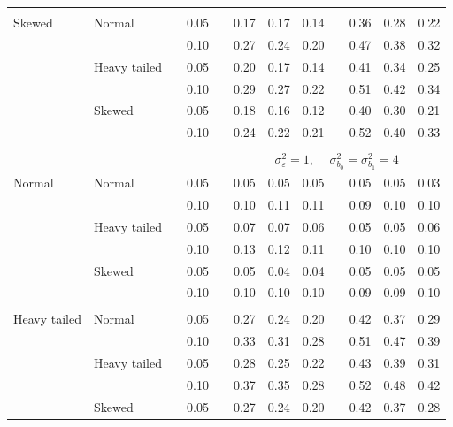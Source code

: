 \documentclass[12pt]{article} %
\begin{document}
\begin{table}[ht]
\begin{scriptsize}
\begin{center}
\begin{tabular}{ll p{.1cm} c p{.1cm} rrr p{.1cm} rrr}
             &&&&&&&&&&&\\
Skewed       & Normal       && 0.05 &&   0.17 & 0.17 & 0.14 && 0.36 & 0.28 & 0.22 \\ 
             &              && 0.10 &&   0.27 & 0.24 & 0.20 && 0.47 & 0.38 & 0.32 \\ 
             & Heavy tailed && 0.05 &&   0.20 & 0.17 & 0.14 && 0.41 & 0.34 & 0.25 \\ 
             &              && 0.10 &&   0.29 & 0.27 & 0.22 && 0.51 & 0.42 & 0.34 \\ 
             & Skewed       && 0.05 &&   0.18 & 0.16 & 0.12 && 0.40 & 0.30 & 0.21 \\ 
             &              && 0.10 &&   0.24 & 0.22 & 0.21 && 0.52 & 0.40 & 0.33 \\ 


&&&&&&&&&&&\\
& && && \multicolumn{7}{c}{$\sigma_{\varepsilon}^2 = 1$, \ \ $\sigma_{b_0}^2 = \sigma_{b_1}^2 = 4$} \\ \cline{6-12}
\rowcolor{gray!20}Normal       & Normal       && 0.05 &&   0.05 & 0.05 & 0.05 && 0.05 & 0.05 & 0.03 \\ 
\rowcolor{gray!20}             &              && 0.10 &&   0.10 & 0.11 & 0.11 && 0.09 & 0.10 & 0.10 \\ 
\rowcolor{gray!20}             & Heavy tailed && 0.05 &&   0.07 & 0.07 & 0.06 && 0.05 & 0.05 & 0.06 \\ 
\rowcolor{gray!20}             &              && 0.10 &&   0.13 & 0.12 & 0.11 && 0.10 & 0.10 & 0.10 \\ 
\rowcolor{gray!20}             & Skewed       && 0.05 &&   0.05 & 0.04 & 0.04 && 0.05 & 0.05 & 0.05 \\ 
\rowcolor{gray!20}             &              && 0.10 &&   0.10 & 0.10 & 0.10 && 0.09 & 0.09 & 0.10 \\ 
             &&&&&&&&&&&\\
Heavy tailed & Normal       && 0.05 &&   0.27 & 0.24 & 0.20 && 0.42 & 0.37 & 0.29 \\ 
             &              && 0.10 &&   0.33 & 0.31 & 0.28 && 0.51 & 0.47 & 0.39 \\ 
             & Heavy tailed && 0.05 &&   0.28 & 0.25 & 0.22 && 0.43 & 0.39 & 0.31 \\ 
             &              && 0.10 &&   0.37 & 0.35 & 0.28 && 0.52 & 0.48 & 0.42 \\ 
             & Skewed       && 0.05 &&   0.27 & 0.24 & 0.20 && 0.42 & 0.37 & 0.28 \\ 

\end{tabular}
\end{center}
\end{scriptsize}
\end{table}
\end{document}
